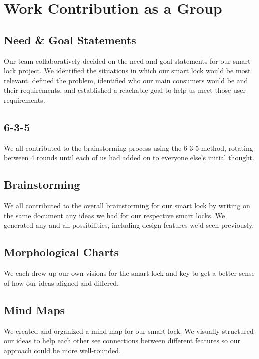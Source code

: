 \section{Work Contribution as a Group}

\subsection*{Need \& Goal Statements}
Our team collaboratively decided on the need and goal statements for our smart lock project. We identified the situations in which our smart lock would be most relevant, defined the problem, identified who our main consumers would be and their requirements, and established a reachable goal to help us meet those user requirements.

\subsection*{6-3-5}
We all contributed to the brainstorming process using the 6-3-5 method, rotating between 4 rounds until each of us had added on to everyone else's initial thought. 

\subsection*{Brainstorming}
We all contributed to the overall brainstorming for our smart lock by writing on the same document any ideas we had for our respective smart locks. We generated any and all possibilities, including design features we'd seen previously. 

\subsection*{Morphological Charts}
We each drew up our own visions for the smart lock and key to get a better sense of how our ideas aligned and differed.

\subsection*{Mind Maps}
We created and organized a mind map for our smart lock. We visually structured our ideas to help each other see connections between different features so our approach could be more well-rounded.